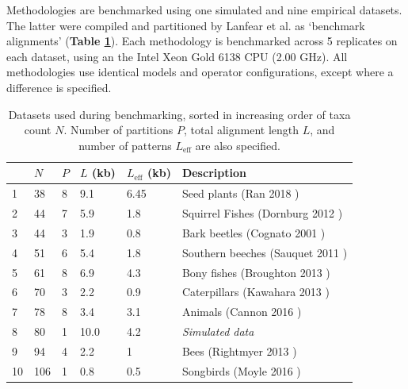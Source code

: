 \documentclass[10pt,letterpaper]{article}
\begin{document}
Methodologies are benchmarked using one simulated and nine empirical datasets.
The latter were compiled \cite{lanfear2019Github} and partitioned \cite{lanfear2016partitionfinder} by Lanfear et al. as `benchmark alignments' (\textbf{Table \ref{table:datasets}}).
Each methodology is benchmarked across 5 replicates on each dataset, using an the Intel Xeon Gold 6138 CPU (2.00 GHz).
All methodologies use identical models and operator configurations, except where a difference is specified.





\begin{table}[h!]
\centering
\begin{tabular}{|l| l l l l l|} 
 \hline
  & $N$ & $P$ & $L$ (kb) & $L_\text{eff}$ (kb) & \textbf{Description} \\
  \hline
 
 
 1  &  38  &  8  &  9.1  &  6.45  &  Seed plants (Ran 2018 \cite{Ran_2018}) \\ 

2  &  44  &  7  &  5.9  &  1.8  &  Squirrel Fishes (Dornburg 2012 \cite{Dornburg_2012}) \\ 

3  &  44  &  3  &  1.9  &  0.8  &  Bark beetles (Cognato 2001 \cite{Cognato_2001}) \\ 

4  &  51  &  6  &  5.4  &  1.8  &  Southern beeches (Sauquet 2011 \cite{Sauquet_2011}) \\ 

5  &  61  &  8  &  6.9  &  4.3  &  Bony fishes (Broughton 2013 \cite{Broughton_2013}) \\ 

6  &  70  &  3  &  2.2  &  0.9  &  Caterpillars (Kawahara 2013 \cite{Kawahara_2013}) \\ 

7  &  78  &  8  &  3.4  &  3.1  &  Animals (Cannon 2016 \cite{Cannon_2016}) \\ 

8  &  80  &  1 &  10.0  &  4.2  &  \textit{Simulated data}  \\ 

9  &  94  &  4  &  2.2  &  1  &  Bees (Rightmyer 2013 \cite{Rightmyer_2013}) \\ 

10  &  106  &  1  &  0.8  &  0.5  &  Songbirds (Moyle 2016 \cite{Moyle_2016}) \\ 





 \hline
\end{tabular}
\caption{Datasets used during benchmarking, sorted in increasing order of taxa count $N$. Number of partitions $P$, total alignment length $L$, and number of patterns $L_\text{eff}$ are also specified.}
\label{table:datasets}
\end{table}
\end{document}
